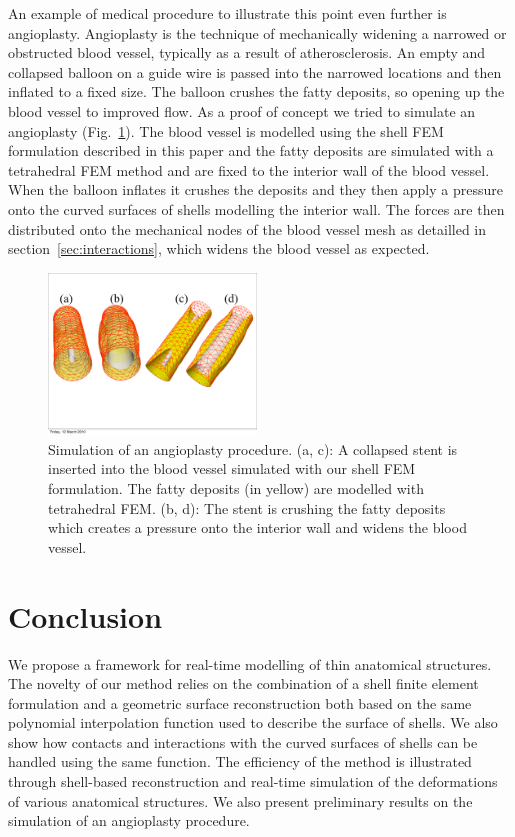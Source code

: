 \documentclass{llncs}
\begin{document}
An example of medical procedure to illustrate this point even further is angioplasty. Angioplasty is the technique of mechanically widening a narrowed or obstructed blood vessel, typically as a result of atherosclerosis. An empty and collapsed balloon on a guide wire is passed into the narrowed locations and then inflated to a fixed size. The balloon crushes the fatty deposits, so opening up the blood vessel to improved flow. As a proof of concept we tried to simulate an angioplasty (Fig.~\ref{fig-stent}). The blood vessel is modelled using the shell FEM formulation described in this paper and the fatty deposits are simulated with a tetrahedral FEM method and are fixed to the interior wall of the blood vessel. When the balloon inflates it crushes the deposits and they then apply a pressure onto the curved surfaces of shells modelling the interior wall. The forces are then distributed onto the mechanical nodes of the blood vessel mesh as detailled in section~\ref{sec:interactions}, which widens the blood vessel as expected. 
%
\begin{figure}
\centering
\includegraphics[height=4.3cm]{images/stenose_final.pdf}
\caption {Simulation of an angioplasty procedure. (a, c): A collapsed stent is inserted into the blood vessel simulated with our shell FEM formulation. The fatty deposits (in yellow) are modelled with tetrahedral FEM. (b, d): The stent is crushing the fatty deposits which creates a pressure onto the interior wall and widens the blood vessel.}
\label{fig-stent}
\end{figure}
%
\vspace{-0.1cm}
\section{Conclusion}
\vspace{-0.1cm}
We propose a framework for real-time modelling of thin anatomical structures. The novelty of our method relies on the combination of a shell finite element formulation and a geometric surface reconstruction both based on the same polynomial interpolation function used to describe the surface of shells. We also show how contacts and interactions with the curved surfaces of shells can be handled using the same function. The efficiency of the method is illustrated through shell-based reconstruction and real-time simulation of the deformations of various anatomical structures. We also present preliminary results on the simulation of an angioplasty procedure. 
%
%


\end{document}
